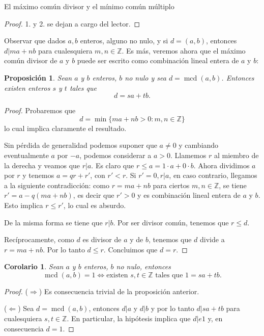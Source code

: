 \documentclass[11pt,spanish,makeidx]{amsbook}
\newtheorem{proposicion}[teorema]{Proposici\'on}
\newtheorem{corolario}[teorema]{Corolario}
\theoremstyle{definition}
\theoremstyle{remark}
\newcommand \ZZ{{\mathbb Z}}
\newcommand \mcd{\operatorname{mcd}}
\begin{document}
\begin{section}{El máximo común divisor y el mínimo común múltiplo}
\begin{proof}
1. y 2.  se dejan a cargo del lector. 
\end{proof}

Observar que dados $a,b$  enteros,  alguno no nulo, y si  $d= (a,b)$,  entonces  $d|m a+n b$ para cualesquiera  $m,n\in \ZZ$. Es más,  veremos ahora que el máximo común divisor de $a$ y $b$ puede ser escrito como combinación lineal entera de $a$ y $b$:

\begin{proposicion} \label{t1.7.1} Sean $a$ y $b$ enteros, $b$ no nulo y sea $d=\mcd(a,b)$. Entonces existen enteros $s$ y $t$ tales que
	\begin{equation*}
		d=s a+t b.
	\end{equation*}
\end{proposicion}
\begin{proof}
	Probaremos  que 
	\begin{equation*}
	d={\operatorname{min}}\{m a+n b>0 : m,n\in \ZZ\}
	\end{equation*}
	lo cual implica claramente el resultado. 
	
	Sin pérdida de generalidad podemos suponer  que $a\ne 0$ y cambiando eventualmente $a$ por $-a$, podemos considerar  a $a>0$. Llamemos $r$ al miembro de la derecha y veamos que  $r\vert a$. Es claro que $r\le a=1\cdot a+0\cdot b$. Ahora dividimos $a$ por $r$ y tenemos $a=q r+r'$, con $r'<r$. Si $r'=0, r\vert a$, en caso contrario, llegamos a la siguiente contradicción: como $r=m a+n b$ para ciertos $m,n\in\mathbb{Z}$, se tiene $r'=a-q(m a+n b)$, es decir que $r'> 0$ y es combinación lineal entera de $a$ y $b$. Esto implica $r\le r'$, lo cual es absurdo.
	
	De la misma forma se tiene que $r\vert b$. Por ser divisor común, tenemos que $r\le d$.
	
	Recíprocamente, como $d$ es divisor de $a$ y de  $b$, tenemos que $d$ divide a $r=m a+n b$. Por lo tanto $d\le r$. Concluimos que $d=r$.
\end{proof}

\begin{corolario} Sean $a$ y $b$ enteros, $b$ no nulo, entonces
	$$
	\mcd(a,b) = 1 \Leftrightarrow \text{existen $s,t \in \mathbb Z$ tales que $1 = sa+tb$.}
	$$
\end{corolario}
\begin{proof}
	($\Rightarrow$) Es consecuencia trivial de la proposición anterior.
	
	($\Leftarrow$) Sea $d = \mcd(a,b)$, entonces $d|a$ y $d|b$ y por lo tanto $d|sa+tb$ para cualesquiera   $s,t \in \mathbb Z$.  En particular, la hipótesis implica que $d |e 1$ y, en consecuencia $d =1$. 
\end{proof}


\end{section}
\end{document}
